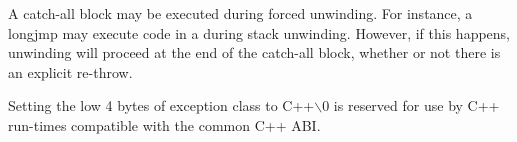 A catch-all block may be executed during forced unwinding.  For
instance, a longjmp may execute code in a  during
stack unwinding. However, if this happens, unwinding will proceed at
the end of the catch-all block, whether or not there is an explicit
re-throw.

Setting the low 4 bytes of exception class to C++$\backslash$0 is reserved
for use by C++ run-times compatible with the common C++ ABI.

